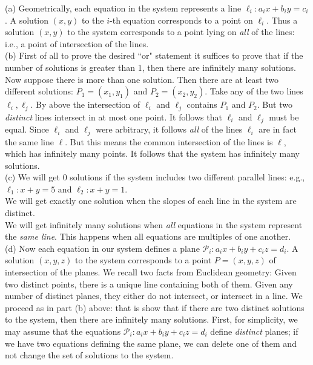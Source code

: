 \begin{solution}
\noindent
(a) Geometrically, each equation  in the system represents a line $\ell_i\colon a_ix+b_iy=c_i$. A solution $(x,y)$ to the $i$-th equation corresponds to a point on $\ell_i$. Thus a solution $(x,y)$ to the system corresponds to a point lying on {\em all} of the lines: i.e., a point of intersection of the lines. 
\\
(b) First of all to prove the desired ``or" statement it suffices to prove that if the number of solutions is greater than 1, then there are infinitely many solutions. 
\\
Now suppose there is more than one solution. Then there are at least two different solutions: $P_1=(x_1,y_1)$ and $P_2=(x_2,y_2)$. Take any of the two lines $\ell_i, \ell_j$. By above the intersection of $\ell_i$ and $\ell_j$ contains $P_1$ and $P_2$. But two {\em distinct} lines intersect in at most one point. It follows that $\ell_i$ and $\ell_j$ must be equal. Since $\ell_i$ and $\ell_j$ were arbitrary, it follows {\em all} of the lines $\ell_i$ are in fact the same line $\ell$.  But this means the common intersection of the lines is $\ell$, which has infinitely many points. It follows that the system has infinitely many solutions. 
\\
(c)  We will get 0 solutions if the system includes two different parallel lines: e.g., $\ell_1\colon x+y=5$ and $\ell_2\colon x+y=1$. 
\\
We will get exactly one solution when the slopes of each line in the system are distinct. 
\\
We will get infinitely many solutions when {\em all} equations in the system represent the {\em same line}. This happens when all equations are multiples of one another. 
\\
(d) Now each equation in our system defines a plane $\mathcal{P}_i\colon a_ix+b_iy+c_iz=d_i$. A solution $(x,y,z)$ to the system corresponds to a point $P=(x,y,z)$ of intersection of the planes. We recall two facts from Euclidean geometry:
\bb
\ii[Fact 1] Given two distinct points, there is a unique line containing both of them.
\ii[Fact 2] Given any number of distinct planes, they either do not intersect, or intersect in a line. 
\ee
We proceed as in part (b) above: that is show that if there are two distinct solutions to the system, then there are infinitely many solutions. First, for simplicity, we may assume that the equations $\mathcal{P}_i\colon a_ix+b_iy+c_iz=d_i$ define {\em distinct} planes; if we have two equations defining the same plane, we can delete one of them and not change the set of solutions to the system. 


\end{solution}
